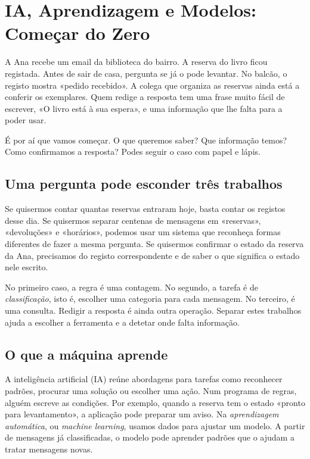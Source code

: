 \chapter{IA, Aprendizagem e Modelos: Começar do Zero}
\label{ch:ia}

\ficcao A Ana recebe um email da biblioteca do bairro. A reserva do livro ficou registada. Antes de sair de casa, pergunta se já o pode levantar. No balcão, o registo mostra «pedido recebido». A colega que organiza as reservas ainda está a conferir os exemplares. Quem redige a resposta tem uma frase muito fácil de escrever, «O livro está à sua espera», e uma informação que lhe falta para a poder usar.

É por aí que vamos começar. O que queremos saber? Que informação temos? Como confirmamos a resposta? Podes seguir o caso com papel e lápis.

\section{Uma pergunta pode esconder três trabalhos}

Se quisermos contar quantas reservas entraram hoje, basta contar os registos desse dia. Se quisermos separar centenas de mensagens em «reservas», «devoluções» e «horários», podemos usar um sistema que reconheça formas diferentes de fazer a mesma pergunta. Se quisermos confirmar o estado da reserva da Ana, precisamos do registo correspondente e de saber o que significa o estado nele escrito.

No primeiro caso, a regra é uma contagem. No segundo, a tarefa é de \emph{classificação}, isto é, escolher uma categoria para cada mensagem. No terceiro, é uma consulta. Redigir a resposta é ainda outra operação. Separar estes trabalhos ajuda a escolher a ferramenta e a detetar onde falta informação.

\section{O que a máquina aprende}

A inteligência artificial (IA) reúne abordagens para tarefas como reconhecer padrões, procurar uma solução ou escolher uma ação. Num programa de regras, alguém escreve as condições. Por exemplo, quando a reserva tem o estado «pronto para levantamento», a aplicação pode preparar um aviso. Na \emph{aprendizagem automática}, ou \emph{machine learning}, usamos dados para ajustar um modelo. A partir de mensagens já classificadas, o modelo pode aprender padrões que o ajudam a tratar mensagens novas.

